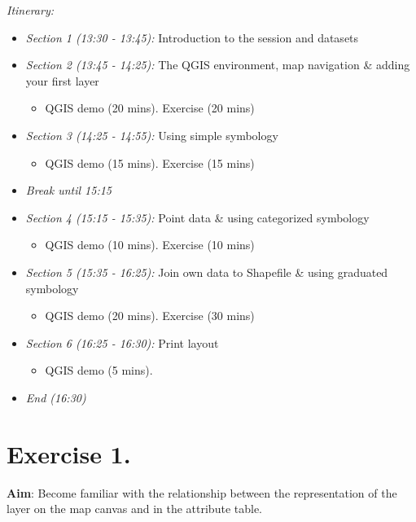 \documentclass{article}
\begin{document}
\emph{Itinerary:}
\begin{itemize}
	\item \emph{Section 1 (13:30 - 13:45):} Introduction to the session and datasets 
		
	\item \emph{Section 2 (13:45 - 14:25):} The QGIS environment, map navigation \& adding your first layer 
	\begin{itemize}
		\item QGIS demo (20 mins). Exercise (20 mins)
	\end{itemize}
	
	\item \emph{Section 3 (14:25 - 14:55):} Using simple symbology
	\begin{itemize}
		\item QGIS demo (15 mins). Exercise (15 mins)
	\end{itemize}
	
	\item \emph{Break until 15:15}

	\item \emph{Section 4 (15:15 - 15:35):} Point data \& using categorized symbology
	\begin{itemize}
		\item QGIS demo (10 mins). Exercise (10 mins)
	\end{itemize}
	
	\item \emph{Section 5 (15:35 - 16:25):} Join own data to Shapefile \& using graduated symbology
	\begin{itemize}
		\item QGIS demo (20 mins). Exercise (30 mins)
	\end{itemize}
	
	\item \emph{Section 6 (16:25 - 16:30):} Print layout
	\begin{itemize}
		\item QGIS demo (5 mins).
	\end{itemize}

	\item \emph{End (16:30)}
\end{itemize}

\newpage

\section{Exercise 1.}
\textbf{Aim}: Become familiar with the relationship between the representation of the layer on the map canvas and in the attribute table.\\
\end{document}
